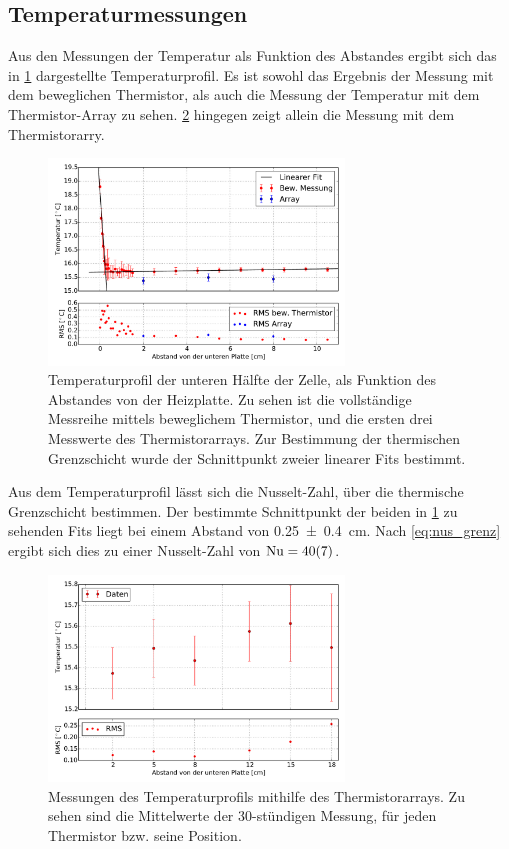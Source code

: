 \subsection{Temperaturmessungen}
Aus den Messungen der Temperatur als Funktion des Abstandes ergibt sich das in \cref{fig:temp-prof} dargestellte Temperaturprofil. Es ist sowohl das Ergebnis der Messung mit dem beweglichen Thermistor, als auch die Messung der Temperatur mit dem Thermistor-Array zu sehen. 
\cref{fig:temp-array} hingegen zeigt allein die Messung mit dem Thermistorarry.
\\
\begin{figure}
\centering
\includegraphics[width=0.7\textwidth]{plots/T_profile2.pdf}
\caption{Temperaturprofil der unteren Hälfte der Zelle, als Funktion des Abstandes von der Heizplatte. Zu sehen ist die vollständige Messreihe mittels beweglichem Thermistor, und die ersten drei Messwerte des Thermistorarrays.
Zur Bestimmung der thermischen Grenzschicht wurde der Schnittpunkt zweier linearer Fits bestimmt.}\label{fig:temp-prof}
\end{figure}
Aus dem Temperaturprofil lässt sich die Nusselt-Zahl, über die thermische Grenzschicht bestimmen. Der bestimmte Schnittpunkt der beiden in \cref{fig:temp-prof} zu sehenden Fits liegt bei einem Abstand von \SI{0.25\pm0.4}{\centi\meter}. Nach \cref{eq:nus_grenz} ergibt sich dies zu einer Nusselt-Zahl von $\text{Nu}=\SI{40\pm7}{}$.
\\
\begin{figure}
	\centering
	\includegraphics[width=0.7\textwidth]{plots/T_korr_profile.pdf}
	\caption{Messungen des Temperaturprofils mithilfe des Thermistorarrays. Zu sehen sind die Mittelwerte der 30-stündigen Messung, für jeden Thermistor bzw. seine Position.}\label{fig:temp-array}
\end{figure}
